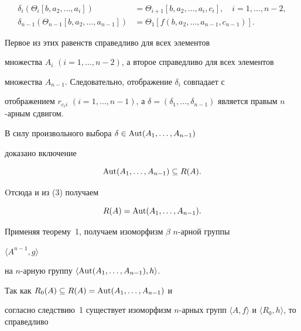 \begin{pf}
\begin{align*}


\delta_i(\Theta_i[b, a_2,\dotsc, a_i]) &=


\Theta_{i+1}[b, a_2,\dotsc, a_i, c_i],\quad i = 1,\dotsc, n-2, \\


%


\delta_{n-1}(\Theta_{n-1}[b, a_2,\dotsc, a_{n-1}]) &=


\Theta_1[f(b, a_2,\dotsc, a_{n-1}, c_{n-1})].


\end{align*}


Первое из этих равенств справедливо для всех элементов


множества $A_i$ $(i=1,\dotsc,n-2)$, а второе справедливо для всех элементов


множества $A_{n-1}$. Следовательно, отображение $\delta_i$ совпадает с


отображением  $r_{c_ii}$ $(i=1,\dotsc,n-1)$, а $\delta = (\delta_1,\dotsc,


\delta_{n-1})$ является правым $n$-арным сдвигом.


В силу произвольного выбора $\delta\in \operatorname{Aut}(A_1,\dotsc, A_{n-1})$


доказано включение


$$


\Aut(A_1,\dotsc, A_{n-1}) \subseteq R(A).


$$


Oтсюда и из (3) получаем


$$


R(A) = \Aut(A_1,\dotsc, A_{n-1}).


$$


Применяя теорему~1, получаем изоморфизм $\beta$ $n$-арной группы


$\langle A^{n-1},g\rangle$


на $n$-арную группу $\langle \operatorname{Aut} (A_1,\dotsc, A_{n-1}), h \rangle $.


\end{pf}





Так как $R_0(A)\subseteq R(A) =\operatorname{Aut}(A_1,\dotsc, A_{n-1})$ и


согласно следствию~1 существует изоморфизм $n$-арных групп $\langle  A,


f \rangle $ и $\langle R_0, h \rangle $, то справедливо





